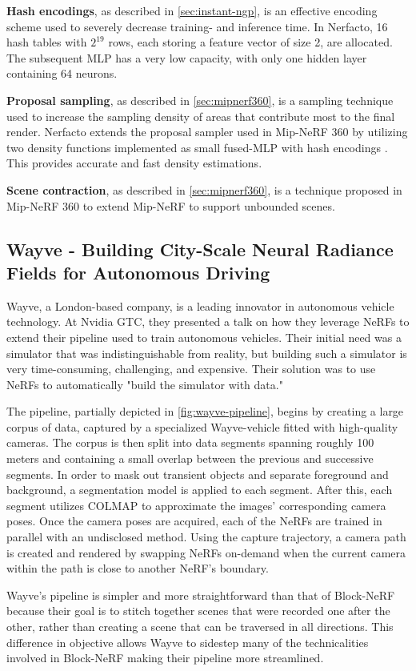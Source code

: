 \textbf{Hash encodings}, as described in \autoref{sec:instant-ngp}, is an effective encoding scheme used to severely decrease training- and inference time. In Nerfacto, 16 hash tables with $2^{19}$ rows, each storing a feature vector of size 2, are allocated. The subsequent MLP has a very low capacity, with only one hidden layer containing 64 neurons.

\textbf{Proposal sampling}, as described in \autoref{sec:mipnerf360}, is a sampling technique used to increase the sampling density of areas that contribute most to the final render. Nerfacto extends the proposal sampler used in Mip-NeRF 360 \cite{barron_mip-nerf_2022} by utilizing two density functions implemented as small fused-MLP with hash encodings \cite{muller_instant_2022}. This provides accurate and fast density estimations.

\textbf{Scene contraction}, as described in \autoref{sec:mipnerf360}, is a technique proposed in Mip-NeRF 360 \cite{barron_mip-nerf_2022} to extend Mip-NeRF to support unbounded scenes.




\subsection[Wayve - NeRFs for Autonomous Driving]{Wayve - Building City-Scale Neural Radiance Fields for Autonomous Driving} \label{sec:wayve}
Wayve, a London-based company, is a leading innovator in autonomous vehicle technology. At Nvidia GTC, they presented a talk on how they leverage NeRFs to extend their pipeline used to train autonomous vehicles. Their initial need was a simulator that was indistinguishable from reality, but building such a simulator is very time-consuming, challenging, and expensive. Their solution was to use NeRFs to automatically "build the simulator with data."

The pipeline, partially depicted in \autoref{fig:wayve-pipeline}, begins by creating a large corpus of data, captured by a specialized Wayve-vehicle fitted with high-quality cameras. The corpus is then split into data segments spanning roughly 100 meters and containing a small overlap between the previous and successive segments. In order to mask out transient objects and separate foreground and background, a segmentation model is applied to each segment. After this, each segment utilizes COLMAP to approximate the images' corresponding camera poses. Once the camera poses are acquired, each of the NeRFs are trained in parallel with an undisclosed method. Using the capture trajectory, a camera path is created and rendered by swapping NeRFs on-demand when the current camera within the path is close to another NeRF's boundary. 



Wayve's pipeline is simpler and more straightforward than that of Block-NeRF because their goal is to stitch together scenes that were recorded one after the other, rather than creating a scene that can be traversed in all directions. This difference in objective allows Wayve to sidestep many of the technicalities involved in Block-NeRF making their pipeline more streamlined.